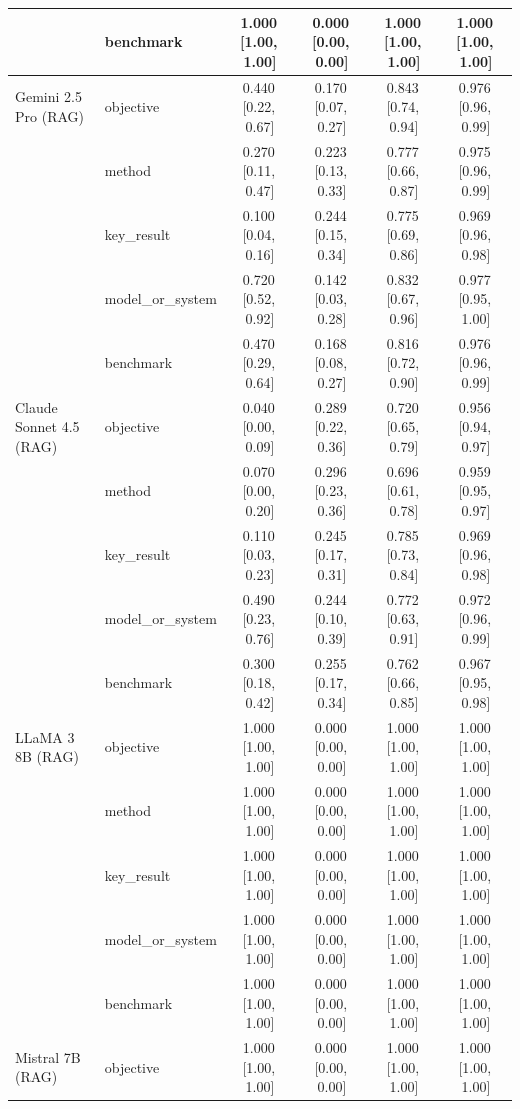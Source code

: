 \documentclass[11pt]{article}
\begin{document}
{\begin{longtable}{@{}p{3.2cm}lcccc@{}}
   & benchmark & 1.000\,[1.00,\,1.00] & 0.000\,[0.00,\,0.00] & 1.000\,[1.00,\,1.00] & 1.000\,[1.00,\,1.00] \\
  \midrule
  Gemini 2.5 Pro (RAG) & objective & 0.440\,[0.22,\,0.67] & 0.170\,[0.07,\,0.27] & 0.843\,[0.74,\,0.94] & 0.976\,[0.96,\,0.99] \\
   & method & 0.270\,[0.11,\,0.47] & 0.223\,[0.13,\,0.33] & 0.777\,[0.66,\,0.87] & 0.975\,[0.96,\,0.99] \\
   & key\_result & 0.100\,[0.04,\,0.16] & 0.244\,[0.15,\,0.34] & 0.775\,[0.69,\,0.86] & 0.969\,[0.96,\,0.98] \\
   & model\_or\_system & 0.720\,[0.52,\,0.92] & 0.142\,[0.03,\,0.28] & 0.832\,[0.67,\,0.96] & 0.977\,[0.95,\,1.00] \\
   & benchmark & 0.470\,[0.29,\,0.64] & 0.168\,[0.08,\,0.27] & 0.816\,[0.72,\,0.90] & 0.976\,[0.96,\,0.99] \\
  \midrule
  Claude Sonnet 4.5 (RAG) & objective & 0.040\,[0.00,\,0.09] & 0.289\,[0.22,\,0.36] & 0.720\,[0.65,\,0.79] & 0.956\,[0.94,\,0.97] \\
   & method & 0.070\,[0.00,\,0.20] & 0.296\,[0.23,\,0.36] & 0.696\,[0.61,\,0.78] & 0.959\,[0.95,\,0.97] \\
   & key\_result & 0.110\,[0.03,\,0.23] & 0.245\,[0.17,\,0.31] & 0.785\,[0.73,\,0.84] & 0.969\,[0.96,\,0.98] \\
   & model\_or\_system & 0.490\,[0.23,\,0.76] & 0.244\,[0.10,\,0.39] & 0.772\,[0.63,\,0.91] & 0.972\,[0.96,\,0.99] \\
   & benchmark & 0.300\,[0.18,\,0.42] & 0.255\,[0.17,\,0.34] & 0.762\,[0.66,\,0.85] & 0.967\,[0.95,\,0.98] \\
  \midrule
  LLaMA 3 8B (RAG) & objective & 1.000\,[1.00,\,1.00] & 0.000\,[0.00,\,0.00] & 1.000\,[1.00,\,1.00] & 1.000\,[1.00,\,1.00] \\
   & method & 1.000\,[1.00,\,1.00] & 0.000\,[0.00,\,0.00] & 1.000\,[1.00,\,1.00] & 1.000\,[1.00,\,1.00] \\
   & key\_result & 1.000\,[1.00,\,1.00] & 0.000\,[0.00,\,0.00] & 1.000\,[1.00,\,1.00] & 1.000\,[1.00,\,1.00] \\
   & model\_or\_system & 1.000\,[1.00,\,1.00] & 0.000\,[0.00,\,0.00] & 1.000\,[1.00,\,1.00] & 1.000\,[1.00,\,1.00] \\
   & benchmark & 1.000\,[1.00,\,1.00] & 0.000\,[0.00,\,0.00] & 1.000\,[1.00,\,1.00] & 1.000\,[1.00,\,1.00] \\
  \midrule
  Mistral 7B (RAG) & objective & 1.000\,[1.00,\,1.00] & 0.000\,[0.00,\,0.00] & 1.000\,[1.00,\,1.00] & 1.000\,[1.00,\,1.00] \\

\end{longtable}}
\end{document}
